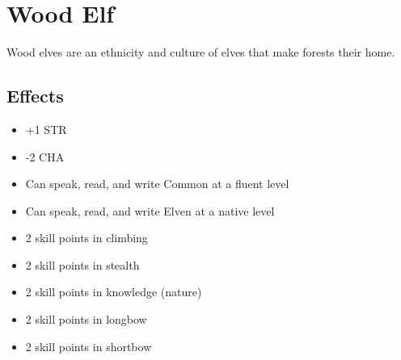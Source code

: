 \section{Wood Elf}\label{culture:wood-elf}
Wood elves are an ethnicity and culture of elves that make forests their
home.

\subsection*{Effects}
\begin{itemize}
    \item +1 STR
    \item -2 CHA
    \item Can speak, read, and write Common at a fluent level
    \item Can speak, read, and write Elven at a native level
    \item 2 skill points in climbing
    \item 2 skill points in stealth
    \item 2 skill points in knowledge (nature)
    \item 2 skill points in longbow
    \item 2 skill points in shortbow
\end{itemize}

